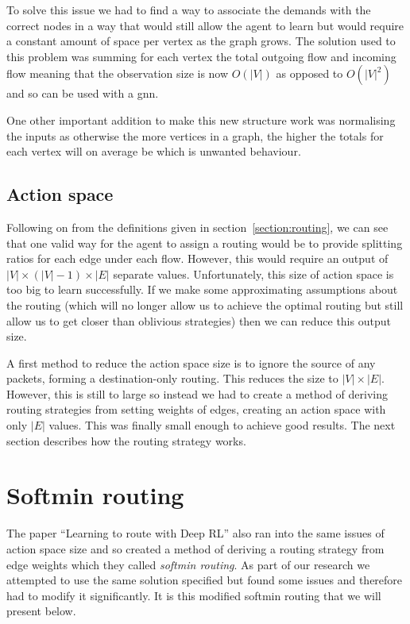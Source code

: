 To solve this issue we had to find a way to associate the demands with the correct nodes in a way that would still allow the agent to learn but would require a constant amount of space per vertex as the graph grows. The solution used to this problem was summing for each vertex the total outgoing flow and incoming flow meaning that the observation size is now $O(|V|)$ as opposed to $O(|V|^2)$ and so can be used with a \ac{gnn}.

One other important addition to make this new structure work was normalising the inputs as otherwise the more vertices in a graph, the higher the totals for each vertex will on average be which is unwanted behaviour.

\subsection{Action space}
Following on from the definitions given in section~\ref{section:routing}, we can see that one valid way for the agent to assign a routing would be to provide splitting ratios for each edge under each flow. However, this would require an output of $|V|\times(|V|-1)\times|E|$ separate values. Unfortunately, this size of action space is too big to learn successfully. If we make some approximating assumptions about the routing (which will no longer allow us to achieve the optimal routing but still allow us to get closer than oblivious strategies) then we can reduce this output size.

A first method to reduce the action space size is to ignore the source of any packets, forming a destination-only routing. This reduces the size to $|V|\times|E|$. However, this is still to large so instead we had to create a method of deriving routing strategies from setting weights of edges, creating an action space with only $|E|$ values. This was finally small enough to achieve good results. The next section describes how the routing strategy works.

\section{Softmin routing}
The paper ``Learning to route with Deep RL''\cite{valadarsky2017learning} also ran into the same issues of action space size and so created a method of deriving a routing strategy from edge weights which they called \emph{softmin routing}. As part of our research we attempted to use the same solution specified but found some issues and therefore had to modify it significantly. It is this modified softmin routing that we will present below.

